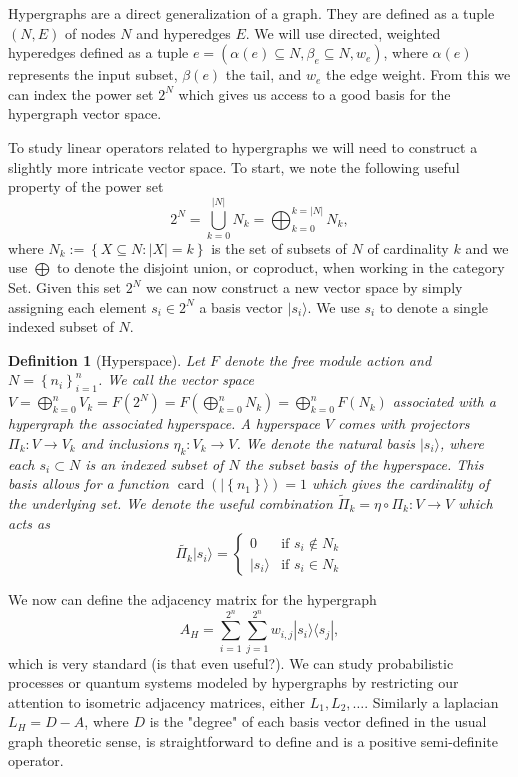 \documentclass{article}
\newcommand{\ket}[1]{|#1\rangle}
\newcommand{\ketbra}[2]{| #1\rangle\! \langle #2|}
\newcommand{\parens}[1]{\left( #1 \right)}
\newcommand{\set}[1]{\left\{ #1 \right\}}
\DeclareMathOperator{\card}{card}
\newcommand{\cardi}[1]{\card \parens{ #1 }}
\newtheorem{defn}{Definition}
\begin{document}
Hypergraphs are a direct generalization of a graph. They are defined as a tuple $(N, E)$ of nodes $N$ and hyperedges $E$. We will use directed, weighted hyperedges defined as a tuple $e = (\alpha(e) \subseteq N, \beta_e \subseteq N, w_e)$, where $\alpha(e)$ represents the input subset, $\beta(e)$ the tail, and $w_e$ the edge weight. From this we can index the power set $2^N$ which gives us access to a good basis for the hypergraph vector space. 

To study linear operators related to hypergraphs we will need to construct a slightly more intricate vector space. To start, we note the following useful property of the power set 
\begin{equation}
    2^N =  \bigcup_{k=0}^{|N|} N_k = \bigoplus_{k=0}^{k = |N|} N_k,
\end{equation}
where $N_k := \set{X \subseteq N : |X| = k}$ is the set of subsets of $N$ of cardinality $k$ and we use $\bigoplus$ to denote the disjoint union, or coproduct, when working in the category Set. Given this set $2^N$ we can now construct a new vector space by simply assigning each element $s_i \in 2^N$ a basis vector $\ket{s_i}$. We use $s_i$ to denote a single indexed subset of $N$. 

\begin{defn}[Hyperspace]
    Let $F$ denote the free module action and $N = \set{n_i}_{i=1}^n$. We call the vector space $V = \bigoplus_{k=0}^n V_k = F(2^N) = F(\bigoplus_{k=0}^n N_k) = \bigoplus_{k=0}^n F(N_k)$ associated with a hypergraph the associated hyperspace. A hyperspace $V$ comes with projectors $\Pi_k : V \to V_k$ and inclusions $\eta_k : V_k \to V$. We denote the natural basis $\ket{s_i}$, where each $s_i \subset N$ is an indexed subset of $N$ the subset basis of the hyperspace. This basis allows for a function $\cardi{\ket{\set{n_1}}} = 1$ which gives the cardinality of the underlying set. We denote the useful combination $\widetilde{\Pi}_k = \eta \circ \Pi_k : V \to V$ which acts as
    \begin{equation}
        \widetilde{\Pi_k} \ket{s_i} = \begin{cases}
            0 & \text{if } s_i \notin N_k \\
            \ket{s_i} & \text{if } s_i \in N_k 
        \end{cases}
    \end{equation}
\end{defn}

We now can define the adjacency matrix for the hypergraph
\begin{equation}
    A_H = \sum_{i=1}^{2^n} \sum_{j=1}^{2^n} w_{i,j} \ketbra{s_i}{s_j},
\end{equation}
which is very standard (is that even useful?). We can study probabilistic processes or quantum systems modeled by hypergraphs by restricting our attention to isometric adjacency matrices, either $L_1, L_2, \ldots$. 
Similarly a laplacian $L_H = D - A$, where $D$ is the "degree" of each basis vector defined in the usual graph theoretic sense, is straightforward to define and is a positive semi-definite operator. 
\end{document}
